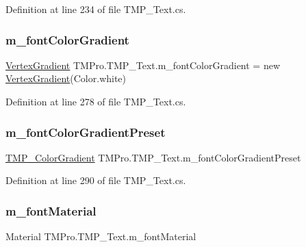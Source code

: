 Definition at line 234 of file T\+M\+P\+\_\+\+Text.\+cs.

\mbox{\label{class_t_m_pro_1_1_t_m_p___text_ac424609fe2089736a5a46dfaf38e7d29}} 
\subsubsection{\texorpdfstring{m\_fontColorGradient}{m\_fontColorGradient}}
{\footnotesize\ttfamily \mbox{\hyperlink{struct_t_m_pro_1_1_vertex_gradient}{Vertex\+Gradient}} T\+M\+Pro.\+T\+M\+P\+\_\+\+Text.\+m\+\_\+font\+Color\+Gradient = new \mbox{\hyperlink{struct_t_m_pro_1_1_vertex_gradient}{Vertex\+Gradient}}(Color.\+white)\hspace{0.3cm}{\ttfamily [protected]}}



Definition at line 278 of file T\+M\+P\+\_\+\+Text.\+cs.

\mbox{\label{class_t_m_pro_1_1_t_m_p___text_a11bac227cb5d775ab2c2ec05bd38efd8}} 
\subsubsection{\texorpdfstring{m\_fontColorGradientPreset}{m\_fontColorGradientPreset}}
{\footnotesize\ttfamily \mbox{\hyperlink{class_t_m_pro_1_1_t_m_p___color_gradient}{T\+M\+P\+\_\+\+Color\+Gradient}} T\+M\+Pro.\+T\+M\+P\+\_\+\+Text.\+m\+\_\+font\+Color\+Gradient\+Preset\hspace{0.3cm}{\ttfamily [protected]}}



Definition at line 290 of file T\+M\+P\+\_\+\+Text.\+cs.

\mbox{\label{class_t_m_pro_1_1_t_m_p___text_afbb084460e2b6a1afa1ae8b239c18392}} 
\subsubsection{\texorpdfstring{m\_fontMaterial}{m\_fontMaterial}}
{\footnotesize\ttfamily Material T\+M\+Pro.\+T\+M\+P\+\_\+\+Text.\+m\+\_\+font\+Material\hspace{0.3cm}{\ttfamily [protected]}}



